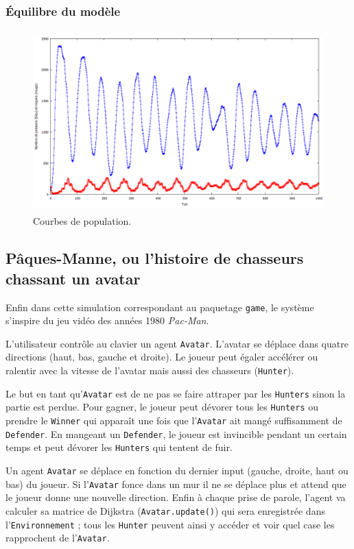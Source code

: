 \documentclass[a4paper]{article}
\begin{document}
\subsubsection{Équilibre du modèle}
\begin{figure}[!h]
\centering
\includegraphics[height=7cm]{1000tours.png}
\caption{Courbes de population.}
\end{figure}


\subsection{Pâques-Manne, ou l'histoire de chasseurs chassant un avatar}
Enfin dans cette simulation correspondant au paquetage \texttt{game}, le système s'inspire du jeu vidéo des années 1980 \textit{Pac-Man}. 

\medskip
L'utilisateur contrôle au clavier un agent \texttt{Avatar}. L'avatar se déplace dans quatre directions (haut, bas, gauche et droite). Le joueur peut égaler accélérer ou ralentir avec la vitesse de l'avatar mais aussi des chasseurs (\texttt{Hunter}).

\medskip
Le but en tant qu'\texttt{Avatar} est de ne pas se faire attraper par les \texttt{Hunters} sinon la partie est perdue. Pour gagner, le joueur peut dévorer tous les \texttt{Hunters} ou prendre le \texttt{Winner} qui apparaît une fois que l'\texttt{Avatar} ait mangé suffisamment de \texttt{Defender}. En mangeant un \texttt{Defender}, le joueur est invincible pendant un certain temps et peut dévorer les \texttt{Hunters} qui tentent de fuir.

\medskip
Un agent \texttt{Avatar} se déplace en fonction du dernier input (gauche, droite, haut ou bas) du joueur. Si l'\texttt{Avatar} fonce dans un mur il ne se déplace plus et attend que le joueur donne une nouvelle direction. Enfin à chaque prise de parole, l'agent va calculer sa matrice de Dijkstra (\texttt{Avatar.update()}) qui sera enregistrée dans l'\texttt{Environnement} ; tous les \texttt{Hunter} peuvent ainsi y accéder et voir quel case les rapprochent de l'\texttt{Avatar}.
\end{document}
